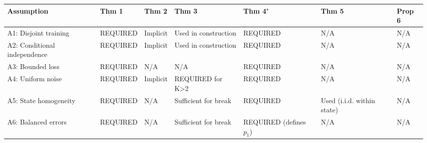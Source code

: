 \documentclass[
  12pt,
]{ctexart}
\begin{document}
\begin{longtable}[]{@{}
  >{\raggedright\arraybackslash}p{}
  >{\raggedright\arraybackslash}p{}
  >{\raggedright\arraybackslash}p{}
  >{\raggedright\arraybackslash}p{}
  >{\raggedright\arraybackslash}p{}
  >{\raggedright\arraybackslash}p{}
  >{\raggedright\arraybackslash}p{}@{}}
\toprule\noalign{}
\begin{minipage}[b]{\linewidth}\raggedright
Assumption
\end{minipage} & \begin{minipage}[b]{\linewidth}\raggedright
Thm 1
\end{minipage} & \begin{minipage}[b]{\linewidth}\raggedright
Thm 2
\end{minipage} & \begin{minipage}[b]{\linewidth}\raggedright
Thm 3
\end{minipage} & \begin{minipage}[b]{\linewidth}\raggedright
Thm 4'
\end{minipage} & \begin{minipage}[b]{\linewidth}\raggedright
Thm 5
\end{minipage} & \begin{minipage}[b]{\linewidth}\raggedright
Prop 6
\end{minipage} \\
\midrule\noalign{}
\endhead
\bottomrule\noalign{}
\endlastfoot
A1: Disjoint training & REQUIRED & Implicit & Used in construction &
REQUIRED & N/A & N/A \\
A2: Conditional independence & REQUIRED & Implicit & Used in
construction & REQUIRED & N/A & N/A \\
A3: Bounded loss & REQUIRED & N/A & N/A & REQUIRED & N/A & N/A \\
A4: Uniform noise & REQUIRED & Implicit & REQUIRED for K\textgreater2 &
REQUIRED & N/A & N/A \\
A5: State homogeneity & REQUIRED & N/A & Sufficient for break & REQUIRED
& Used (i.i.d. within state) & N/A \\
A6: Balanced errors & REQUIRED & N/A & Sufficient for break & REQUIRED
(defines \(p_1\)) & N/A & N/A \\
\end{longtable}
\end{document}
